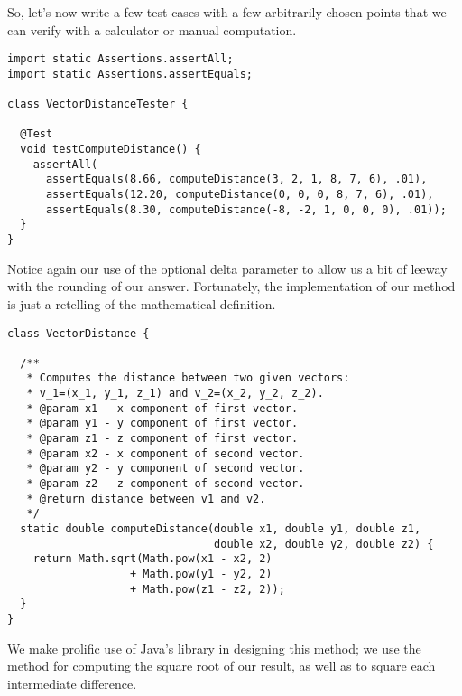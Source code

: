 So, let's now write a few test cases with a few arbitrarily-chosen points that we can verify with a calculator or manual computation.

\begin{lstlisting}[language=MyJava]
import static Assertions.assertAll;
import static Assertions.assertEquals;

class VectorDistanceTester {

  @Test
  void testComputeDistance() {
    assertAll(
      assertEquals(8.66, computeDistance(3, 2, 1, 8, 7, 6), .01),
      assertEquals(12.20, computeDistance(0, 0, 0, 8, 7, 6), .01),
      assertEquals(8.30, computeDistance(-8, -2, 1, 0, 0, 0), .01));
  }
}
\end{lstlisting}

Notice again our use of the optional delta parameter to allow us a bit of leeway with the rounding of our answer. Fortunately, the implementation of our method is just a retelling of the mathematical definition.

\begin{lstlisting}[language=MyJava]
class VectorDistance {

  /**
   * Computes the distance between two given vectors:
   * v_1=(x_1, y_1, z_1) and v_2=(x_2, y_2, z_2).
   * @param x1 - x component of first vector.
   * @param y1 - y component of first vector.
   * @param z1 - z component of first vector.
   * @param x2 - x component of second vector.
   * @param y2 - y component of second vector.
   * @param z2 - z component of second vector.
   * @return distance between v1 and v2.
   */
  static double computeDistance(double x1, double y1, double z1, 
                                double x2, double y2, double z2) {
    return Math.sqrt(Math.pow(x1 - x2, 2) 
                   + Math.pow(y1 - y2, 2)
                   + Math.pow(z1 - z2, 2));
  }
}
\end{lstlisting}

We make prolific use of Java's  library in designing this method; we use the  method for computing the square root of our result, as well as  to square each intermediate difference.


